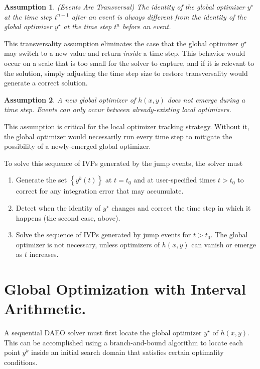 \documentclass[twoside,leqno, twocolumn]{article}
\newtheorem{assumption}{Assumption}[section]
\begin{document}
\begin{assumption} 
	\label{assume:events-transversal}
	(Events Are Transversal)
	The identity of the global optimizer $y^\star$ at the time step $t^{n+1}$ \textit{after} an event is always different from the identity of the global optimizer $y^\star$ at the time step $t^n$ \textit{before} an event. 
\end{assumption}

This transversality assumption eliminates the case that the global optimizer $y^\star$ may switch to a new value and return \textit{inside} a time step. This behavior would occur on a scale that is too small for the solver to capture, and if it is relevant to the solution, simply adjusting the time step size to restore transversality would generate a correct solution.

\begin{assumption}
	\label{assume:global-does-not-emerge}
	A new global optimizer of $h(x, y)$ does not emerge during a time step. Events can only occur between already-existing local optimizers.
\end{assumption}

This assumption is critical for the local optimizer tracking strategy. Without it, the global optimizer would necessarily run every time step to mitigate the possibility of a newly-emerged global optimizer.


To solve this sequence of IVPs generated by the jump events, the solver must 
\begin{enumerate}
	\item Generate the set $\left\{y^k(t)\right\}$ at $t=t_0$ and at user-specified times $t>t_0$ to correct for any integration error that may accumulate.
	\item Detect when the identity of $y^\star$ changes and correct the time step in which it happens (the second case, above).
	\item Solve the sequence of IVPs generated by jump events for $t>t_0$. The global optimizer is not necessary, unless optimizers of $h(x, y)$ can vanish or emerge as $t$ increases.
\end{enumerate}

\section{Global Optimization with Interval Arithmetic.}
A sequential DAEO solver must first locate the global optimizer $y^\star$ of $h(x, y)$. This can be accomplished using a branch-and-bound algorithm to locate each point $y^k$ inside an initial search domain that satisfies certain optimality conditions.
\end{document}
